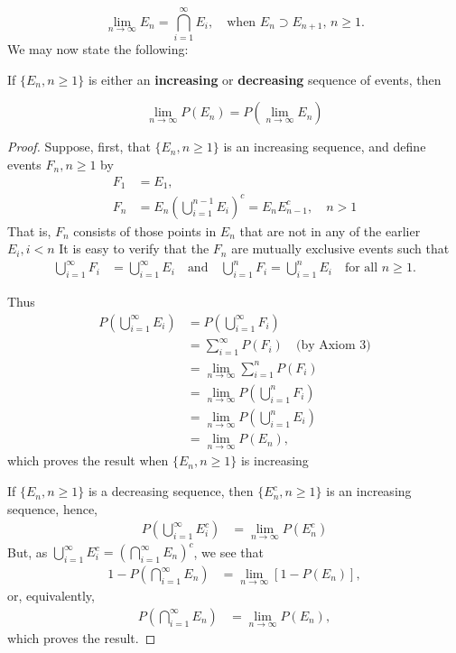 \documentclass[lang=cn,10pt,thmcnt=section]{elegantbook}
\begin{document}
\[
\lim_{n \to \infty} E_n = \bigcap_{i=1}^{\infty} E_i, \quad \text{when } E_n \supset E_{n+1}, \, n \geq 1.
\]
\vspace{3pt}
We may now state the following:
\begin{proposition}
	If \(\{E_n, n \geq 1\}\) is either an \textbf{increasing} or \textbf{decreasing} sequence of events, then

\[
\lim_{n \to \infty} P(E_n) = P\left(\lim_{n \to \infty} E_n\right)
\]
\end{proposition}
\begin{proof}
	Suppose, first, that $\{E_n, n \geq 1\}$ is an increasing sequence, and define events $F_n, n \geq 1$ by
	\begin{align*}
	F_1 &= E_1, \\
	F_n &= E_n \left( \bigcup_{i=1}^{n-1} E_i \right)^c = E_n E_{n-1}^c, \quad n > 1
	\end{align*}
	That is, $F_n$ consists of those points in $E_n$ that are not in any of the earlier $E_i, i < n$ It is easy to verify that the $F_n$ are mutually exclusive events such that
	\begin{align*}
	\bigcup_{i=1}^{\infty} F_i &= \bigcup_{i=1}^{\infty} E_i \quad \text{and} \quad \bigcup_{i=1}^{n} F_i = \bigcup_{i=1}^{n} E_i \quad \text{for all } n \geq 1.
	\end{align*}
	
	Thus
	\begin{align*}
	P\left( \bigcup_{i=1}^{\infty} E_i \right) &= P\left( \bigcup_{i=1}^{\infty} F_i \right) \\
	&= \sum_{i=1}^{\infty} P(F_i) \quad \text{(by Axiom 3)} \\
	&= \lim_{n \to \infty} \sum_{i=1}^{n} P(F_i) \\
	&= \lim_{n \to \infty} P\left( \bigcup_{i=1}^{n} F_i \right) \\
	&= \lim_{n \to \infty} P\left( \bigcup_{i=1}^{n} E_i \right) \\
	&= \lim_{n \to \infty} P(E_n),
	\end{align*}
	which proves the result when $\{E_n, n \geq 1\}$ is increasing
	
	If $\{E_n, n \geq 1\}$ is a decreasing sequence, then $\{E_n^c, n \geq 1\}$ is an increasing sequence, hence,
	\begin{align*}
	P\left( \bigcup_{i=1}^{\infty} E_i^c \right) &= \lim_{n \to \infty} P(E_n^c)
	\end{align*}
	But, as $\bigcup_{i=1}^{\infty} E_i^c = \left( \bigcap_{i=1}^{\infty} E_n \right)^c$, we see that
	\begin{align*}
	1 - P\left( \bigcap_{i=1}^{\infty} E_n \right) &= \lim_{n \to \infty} [1 - P(E_n)],
	\end{align*}
	or, equivalently,
	\begin{align*}
	P\left( \bigcap_{i=1}^{\infty} E_n \right) &= \lim_{n \to \infty} P(E_n),
	\end{align*}
	which proves the result.
\end{proof}
\end{document}
